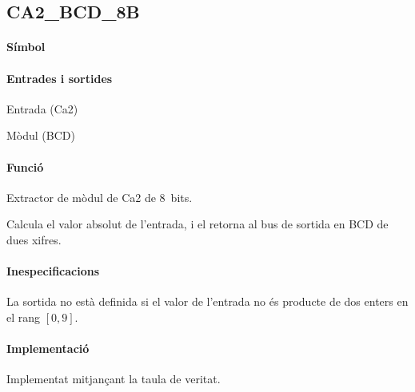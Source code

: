 \subsection{\label{sub:\projectname-CA2_BCD_8B} \textsf{CA2\_BCD\_8B}}

\paragraph{Símbol}

\begin{center}  \end{center}

\paragraph{Entrades i sortides}

\begin{where}
\item[\nodenamerange{CA2}{7}{0}] Entrada (Ca2)
\item[\nodenamerange{BCD}{7}{0}] Mòdul (BCD)
\end{where}

\paragraph{Funció}

Extractor de mòdul de Ca2 de 8~bits.

Calcula el valor absolut de l'entrada, i el retorna al bus de sortida en BCD de dues xifres.

\paragraph{Inespecificacions}


La sortida no està definida si el valor de l'entrada no és producte de dos
enters en el rang $\left[0, 9\right]$.


\paragraph{Implementació}




Implementat mitjançant la taula de veritat.

\vspace{1cm}
